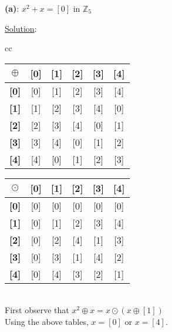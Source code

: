 \documentclass{article} %
\begin{document}
\textbf{(a)}: $x^2 + x = [0]$ in $\mathbb{Z}_5$
\\
\begin{addmargin}[1em]{0em}
\underline{Solution}: 
\begin{addmargin}[1em]{0em}
\begin{tabular}{cc}
\begin{tabular}{|c|c|c|c|c|c|}
\hline
\textbf{$\oplus$}&\textbf{[0]}&\textbf{[1]}&\textbf{[2]}&\textbf{[3]}&\textbf{[4]}\\ \hline
\textbf{[0]} & [0] & [1] & [2] & [3] & [4] \\ \hline
\textbf{[1]} & [1] & [2] & [3] & [4] & [0]\\ \hline
\textbf{[2]} & [2] & [3] & [4] & [0] & [1]\\ \hline
\textbf{[3]} & [3] & [4] & [0] & [1] & [2]\\ \hline
\textbf{[4]} & [4] & [0] & [1] & [2] & [3]\\ \hline
\end{tabular}

\quad

\begin{tabular}{|c|c|c|c|c|c|}
\hline
\textbf{$\odot$}&\textbf{[0]}&\textbf{[1]}&\textbf{[2]}&\textbf{[3]}&\textbf{[4]}\\ \hline
\textbf{[0]} & [0] & [0] & [0] & [0] & [0] \\ \hline
\textbf{[1]} & [0] & [1] & [2] & [3] & [4]\\ \hline
\textbf{[2]} & [0] & [2] & [4] & [1] & [3]\\ \hline
\textbf{[3]} & [0] & [3] & [1] & [4] & [2]\\ \hline
\textbf{[4]} & [0] & [4] & [3] & [2] & [1]\\ \hline
\end{tabular}
\end{tabular}
\\ \break First observe that $x^2 \oplus x = x\odot(x \oplus [1])$
\\Using the above tables, $x = [0]$ or $x = [4]$.
\\
\end{addmargin}
\end{addmargin}
\end{document}

